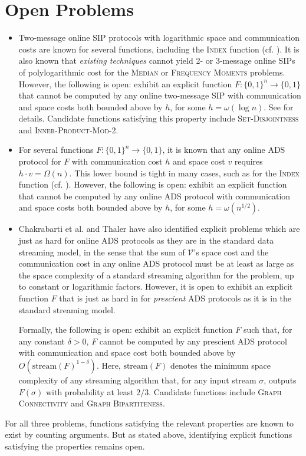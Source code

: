 \documentclass[11pt, letterpaper]{article}
\newcommand{\cV}{\mathcal{V}}
\begin{document}
\section{Open Problems}
\begin{itemize}
\item Two-message online SIP protocols with logarithmic space and communication costs are known for several functions, including the \textsc{Index} function (cf. \cite{suresh}). It is also known that \emph{existing techniques} cannot yield 2- or 3-message online SIPs of polylogarithmic cost for the \textsc{Median} or \textsc{Frequency Moments} problems.
However, the following is open: exhibit an explicit function $F: \{0, 1\}^n \rightarrow \{0, 1\}$ that cannot be computed by any online two-message SIP with communication and space costs
both bounded above by $h$, for some $h = \omega(\log n)$. See \cite{suresh} for details.
Candidate functions satisfying this property include \textsc{Set-Disjointness} and \textsc{Inner-Product-Mod-2}.
\item For several functions $F \colon \{0, 1\}^n \rightarrow \{0, 1\}$, it is known that
any online ADS protocol for $F$ with communication
cost $h$ and space cost $v$ requires $h \cdot v = \Omega(n)$. This lower bound is tight
in many cases, such as for the \textsc{Index} function (cf. \cite{icalp}). However,
the following is open: exhibit an explicit function that cannot be computed by any online ADS protocol with communication and space costs
 both bounded above by $h$, for some $h=\omega(n^{1/2})$. 
\item Chakrabarti et al. \cite{soda} and Thaler \cite{semistreaming} have also identified explicit problems which are just as hard for online ADS protocols as they are in the standard data streaming model, in the sense that the sum of $\cV$'s space cost and the communication cost in any online ADS protocol must be at least as large as the space complexity of a standard streaming algorithm for the problem, up to constant or logarithmic factors. However, it is open to exhibit an explicit function $F$ that is just as hard in for \emph{prescient} ADS protocols as it is in the standard streaming model. 
 
 Formally, the following is open: exhibit an explicit function $F$ such that, for any constant $\delta > 0$, $F$ cannot be computed by any prescient ADS protocol with communication and space cost both bounded above by $O(\text{stream}(F)^{1-\delta})$. Here, $\text{stream}(F)$ denotes the minimum space complexity of any streaming algorithm that, for any input stream $\sigma$, outputs $F(\sigma)$ with probability at least $2/3$. Candidate functions include \textsc{Graph Connectivity} and \textsc{Graph Bipartiteness}. 
\end{itemize}

For all three problems, functions satisfying the relevant properties are known to exist by counting arguments. But as stated above, identifying explicit functions satisfying the properties remains open.














 
 
\end{document}
